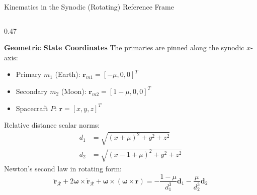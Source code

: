 \documentclass[aspectratio=169, 10pt]{beamer}
\begin{document}
\begin{frame}{Kinematics in the Synodic (Rotating) Reference Frame}
\begin{columns}[t]
        \begin{column}{0.47\textwidth}
            \begin{block}{\textbf{Geometric State Coordinates}}
                \scriptsize
                The primaries are pinned along the synodic $x$-axis:
                \begin{itemize}\setlength{\itemsep}{1.5pt}
                    \item Primary $m_1$ (Earth): $\mathbf{r}_{m1} = [-\mu, 0, 0]^T$
                    \item Secondary $m_2$ (Moon): $\mathbf{r}_{m2} = [1-\mu, 0, 0]^T$
                    \item Spacecraft $P$: $\mathbf{r} = [x, y, z]^T$
                \end{itemize}
                Relative distance scalar norms:
                \begin{align*}
                    d_1 &= \sqrt{(x + \mu)^2 + y^2 + z^2} \\
                    d_2 &= \sqrt{(x - 1 + \mu)^2 + y^2 + z^2}
                \end{align*}
                \vspace{-0.3cm}
                Newton's second law in rotating form:
                {\scriptsize
                \begin{equation*}
                    \ddot{\mathbf{r}}_\mathcal{R} + 2\bm{\omega} \times \dot{\mathbf{r}}_\mathcal{R} + \bm{\omega} \times (\bm{\omega} \times \mathbf{r}) = -\frac{1-\mu}{d_1^3}\mathbf{d}_1 - \frac{\mu}{d_2^3}\mathbf{d}_2
                \end{equation*}}
            \end{block}
        \end{column}
    \end{columns}
\end{frame}
\end{document}

